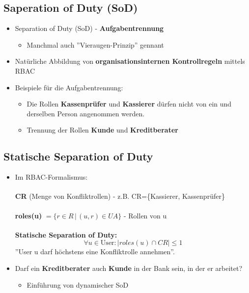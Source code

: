 \documentclass[openany]{book}
\begin{document}
\subsection{Saperation of Duty (SoD)}

\begin{itemize}
    \item Separation of Duty (SoD) - \textbf{Aufgabentrennung}
    \begin{itemize}
        \item Manchmal auch ''Vieraugen-Prinzip'' gennant
    \end{itemize}
    \item Natürliche Abbildung von \textbf{organisationsinternen Kontrollregeln} mittels RBAC
    \item Beispiele für die Aufgabentrennung:
    \begin{itemize}
        \item Die Rollen \textbf{Kassenprüfer} und \textbf{Kassierer} dürfen nicht von ein und derselben Person angenommen werden.
        \item Trennung der Rollen \textbf{Kunde} und \textbf{Kreditberater}
    \end{itemize}
\end{itemize}

\subsection{Statische Separation of Duty}

\begin{itemize}
    \item Im RBAC-Formalismus: \\ \\ \textbf{CR} (Menge von Konfliktrollen) - z.B. CR=\{Kassierer, Kassenprüfer\} \\ \\ \textbf{roles(u)} $=\{ r\in R\, |\, (u,r)\in UA\}$ - Rollen von u \\ \\ \textbf{Statische Separation of Duty:} $$\forall u\in \text{User:} \, |roles(u)\cap CR|\leq 1$$ ''User u darf höchstens eine Konfliktrolle annehmen''.
    \item Darf ein \textbf{Kreditberater} auch \textbf{Kunde} in der Bank sein, in der er arbeitet?
    \begin{itemize}
        \item Einführung von dynamischer SoD
    \end{itemize}
\end{itemize}
\end{document}
